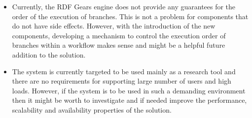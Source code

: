 \begin{itemize}
\item Currently, the RDF Gears engine does not provide any guarantees for the order of the execution of branches. This is not a problem for components that do not have side effects. However, with the introduction of the new components, developing a mechanism to control the execution order of branches within a workflow makes sense and might be a helpful future addition to the solution.

\item The system is currently targeted to be used mainly as a research tool and there are no requirements for supporting large number of users and high loads. However, if the system is to be used in such a demanding environment then it might be worth to investigate and if needed improve the performance, scalability and availability properties of the solution.


\end{itemize}

